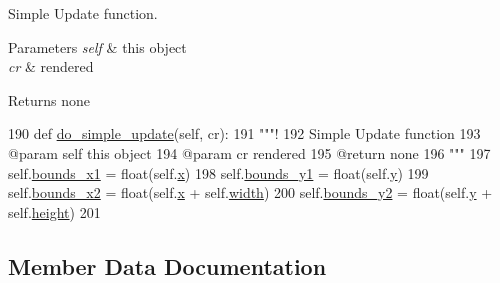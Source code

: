 Simple Update function. 


\begin{DoxyParams}{Parameters}
{\em self} & this object \\
\hline
{\em cr} & rendered \\
\hline
\end{DoxyParams}
\begin{DoxyReturn}{Returns}
none 
\end{DoxyReturn}

\begin{DoxyCode}
190     \textcolor{keyword}{def }\hyperlink{classvisualizer_1_1svgitem_1_1SvgItem_a14724f570ede525807a1148b1295e443}{do\_simple\_update}(self, cr):
191         \textcolor{stringliteral}{"""!}
192 \textcolor{stringliteral}{        Simple Update function}
193 \textcolor{stringliteral}{        @param self this object}
194 \textcolor{stringliteral}{        @param cr rendered}
195 \textcolor{stringliteral}{        @return none}
196 \textcolor{stringliteral}{        """}
197         self.\hyperlink{classvisualizer_1_1svgitem_1_1SvgItem_aad26c81fd84200b922866a9ad3119165}{bounds\_x1} = float(self.\hyperlink{classvisualizer_1_1svgitem_1_1SvgItem_a2e9c288d8f56a32ef5e421f2a18da8d2}{x})
198         self.\hyperlink{classvisualizer_1_1svgitem_1_1SvgItem_aa0f146c39e7b9642ece6945bd2a88112}{bounds\_y1} = float(self.\hyperlink{classvisualizer_1_1svgitem_1_1SvgItem_aa578d8ef1d07a7489ba5e5ae3db9c999}{y})
199         self.\hyperlink{classvisualizer_1_1svgitem_1_1SvgItem_a5c89f17fecfe68834e627463abb75634}{bounds\_x2} = float(self.\hyperlink{classvisualizer_1_1svgitem_1_1SvgItem_a2e9c288d8f56a32ef5e421f2a18da8d2}{x} + self.\hyperlink{classvisualizer_1_1svgitem_1_1SvgItem_a6576a5ad9cd06ff7670b143135eb1b9d}{width})
200         self.\hyperlink{classvisualizer_1_1svgitem_1_1SvgItem_a459361f3b79926d5a9136110ee7bec73}{bounds\_y2} = float(self.\hyperlink{classvisualizer_1_1svgitem_1_1SvgItem_aa578d8ef1d07a7489ba5e5ae3db9c999}{y} + self.\hyperlink{classvisualizer_1_1svgitem_1_1SvgItem_a87072079be0f8db0c514a93ff03c6989}{height})
201 
\end{DoxyCode}


\subsection{Member Data Documentation}
